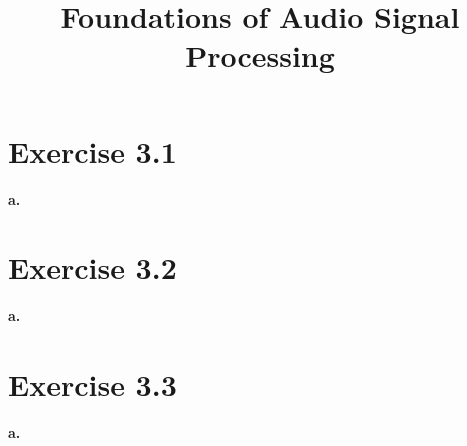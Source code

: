 \documentclass[12pt]{article}
\title{Foundations of Audio Signal Processing\\ \ass}
\author{\auth}
\begin{document}
	\maketitle
	\section*{Exercise 3.1}
	\textbf{a.}
	\section*{Exercise 3.2}
	\textbf{a.}
	\section*{Exercise 3.3}
	\textbf{a.}
\end{document}

